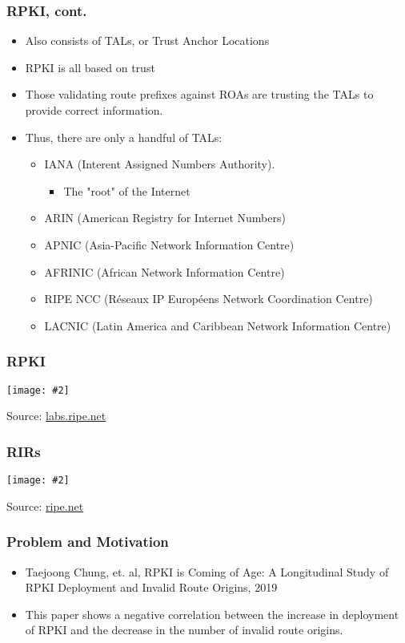 \documentclass{beamer}
\newcommand{\framedgraphic}[3]{
    \begin{frame}
        \frametitle{#1}
        \begin{center}
            \texttt{[image: \#2]}
        \end{center}
        {\small Source: #3}
    \end{frame}
}
\begin{document}
\begin{frame}
    \frametitle{RPKI, cont.}

    \begin{itemize}
        \item Also consists of TALs, or Trust Anchor Locations \pause
        \item RPKI is all based on trust \pause
        \item Those validating route prefixes against ROAs are trusting the TALs to provide correct information. \pause
        \item Thus, there are only a handful of TALs: \pause
        \begin{itemize}
            \item IANA (Interent Assigned Numbers Authority).
            \begin{itemize}
                \item The "root" of the Internet \pause
            \end{itemize}
            \item ARIN (American Registry for Internet Numbers) \pause
            \item APNIC (Asia-Pacific Network Information Centre) \pause
            \item AFRINIC (African Network Information Centre) \pause
            \item RIPE NCC (Réseaux IP Européens Network Coordination Centre) \pause
            \item LACNIC (Latin America and Caribbean Network Information Centre)
        \end{itemize}
    \end{itemize}
\end{frame}

\framedgraphic{RPKI}{pictures/rpki-example.jpeg}{\href{https://labs.ripe.net/Members/waehlisch/copy_of_rpkirtroverview.jpg/image_preview}{labs.ripe.net}}

\framedgraphic{RIRs}{pictures/rirs.png}{\href{https://www.ripe.net/participate/internet-governance/internet-technical-community/the-rir-system/RIPENCCServiceRegionMAP_April201402.jpg}{ripe.net}}

\begin{frame}
    \frametitle{Problem and Motivation}

    \begin{itemize}
        \item Taejoong Chung, et. al, RPKI is Coming of Age: A Longitudinal Study of RPKI Deployment and Invalid Route Origins, 2019\pause
        \item This paper shows a negative correlation between the increase in deployment of RPKI and the decrease in the number of invalid route origins.
    \end{itemize}

\end{frame}
\end{document}
